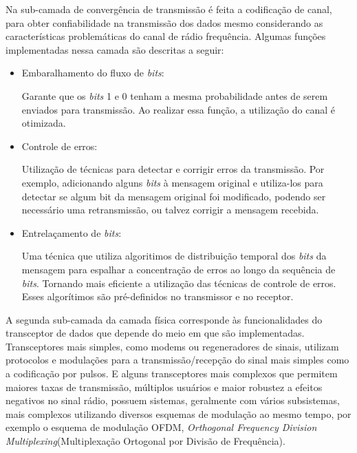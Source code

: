 Na sub-camada de convergência de transmissão é feita a codificação de canal, para obter confiabilidade na transmissão dos dados mesmo considerando as características problemáticas do canal de rádio frequência. Algumas funções implementadas nessa camada são descritas a seguir:
\begin{itemize}
      \item Embaralhamento do fluxo de \emph{bits}:

            Garante que os \emph{bits} 1 e 0 tenham a mesma probabilidade antes de serem enviados para transmissão. Ao realizar essa função, a utilização do canal é otimizada.
      \item Controle de erros:

            Utilização de técnicas para detectar e corrigir erros da transmissão. Por exemplo, adicionando alguns \emph{bits} à mensagem original e utiliza-los para detectar se algum bit da mensagem original foi modificado, podendo ser necessário uma retransmissão, ou talvez corrigir a mensagem recebida.
      \item Entrelaçamento de \emph{bits}:

            Uma técnica que utiliza algoritimos de distribuição temporal dos \emph{bits} da mensagem para espalhar a concentração de erros ao longo da sequência de \emph{bits}. Tornando mais eficiente a utilização das técnicas de controle de erros. Esses algorítimos são pré-definidos no transmissor e no receptor.
\end{itemize}

A segunda sub-camada da camada física corresponde às funcionalidades do transceptor de dados que depende do meio em que são implementadas. Transceptores mais simples, como modems ou regeneradores de sinais, utilizam protocolos e modulações para a transmissão/recepção do sinal mais simples como a codificação por pulsos. E alguns transceptores mais complexos que permitem maiores taxas de transmissão, múltiplos usuários e maior robustez a efeitos negativos no sinal rádio, possuem sistemas, geralmente com vários subsistemas, mais complexos utilizando diversos esquemas de modulação ao mesmo tempo, por exemplo o esquema de modulação OFDM, \emph{Orthogonal Frequency Division Multiplexing}(Multiplexação Ortogonal por Divisão de Frequência).


